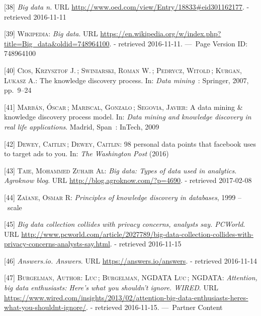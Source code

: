\documentclass[12pt,english,a4paper,titlepage,cleardoublepage=empty,dottedtoc]{report}
\begin{document}
\hypertarget{ref-web_2016_oxford_definition_big-data}{}
{[}38{]} \emph{Big data n.} URL
\url{http://www.oed.com/view/Entry/18833\#eid301162177}. - retrieved
2016-11-11

\hypertarget{ref-web_2016_wikipedia_definition_big-data}{}
{[}39{]} \textsc{Wikipedia}: \emph{Big data}. URL
\url{https://en.wikipedia.org/w/index.php?title=Big_data\&oldid=748964100}.
- retrieved 2016-11-11. ---~Page Version ID: 748964100

\hypertarget{ref-chapter_2007_the-knowledge-discovery-process}{}
{[}40{]} \textsc{Cios, Krzysztof J.}\,; \textsc{Swiniarski, Roman W.}\,;
\textsc{Pedrycz, Witold}\,; \textsc{Kurgan, Lukasz A.}: The knowledge
discovery process. In: \emph{Data mining}~: Springer, 2007, pp.~9--24

\hypertarget{ref-paper_2009_a-data-mining-knowledge-discovery-process-model}{}
{[}41{]} \textsc{Marbán, Óscar}\,; \textsc{Mariscal, Gonzalo}\,;
\textsc{Segovia, Javier}: A data mining \& knowledge discovery process
model. In: \emph{Data mining and knowledge discovery in real life
applications}. Madrid, Span~: InTech, 2009

\hypertarget{ref-web_2016_facebook-utilizes-98-data-points}{}
{[}42{]} \textsc{Dewey, Caitlin}\,; \textsc{Dewey, Caitlin}: 98 personal
data points that facebook uses to target ads to you. In: \emph{The
Washington Post} (2016)

\hypertarget{ref-web_2016_big-data-types-of-data-used-in-analytics}{}
{[}43{]} \textsc{Taie, Mohammed Zuhair Al}: \emph{Big data: Types of
data used in analytics. Agroknow blog}. URL
\url{http://blog.agroknow.com/?p=4690}. - retrieved 2017-02-08

\hypertarget{ref-book-chapter_1999_Principles-of-knowledge-discovery-in-databases_introduction-to-data-mining}{}
{[}44{]} \textsc{Zaïane, Osmar R}: \emph{Principles of knowledge
discovery in databases}, 1999 --~scale

\hypertarget{ref-web_2013_big-data-collection-collides-with-privacy-concerns}{}
{[}45{]} \emph{Big data collection collides with privacy concerns,
analysts say. PCWorld}. URL
\url{http://www.pcworld.com/article/2027789/big-data-collection-collides-with-privacy-concerns-analysts-say.html}.
- retrieved 2016-11-15

\hypertarget{ref-web_2016_answers-io}{}
{[}46{]} \emph{Answers.io. Answers}. URL
\url{https://answers.io/answers}. - retrieved 2016-11-14

\hypertarget{ref-web_2016_big-data-enthusiasts-should-not-ignore}{}
{[}47{]} \textsc{Burgelman, Author: Luc}\,; \textsc{Burgelman, NGDATA
Luc}\,; \textsc{NGDATA}: \emph{Attention, big data enthusiasts: Here's
what you shouldn't ignore. WIRED}. URL
\url{https://www.wired.com/insights/2013/02/attention-big-data-enthusiasts-heres-what-you-shouldnt-ignore/}.
- retrieved 2016-11-15. ---~Partner Content
\end{document}
